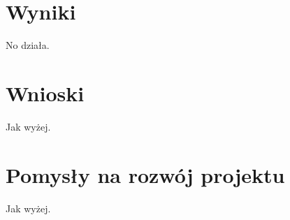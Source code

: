 \section{Wyniki}
No działa.

\section{Wnioski}
Jak wyżej.

\section{Pomysły na rozwój projektu}
Jak wyżej.